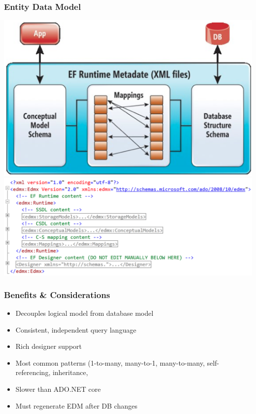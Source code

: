 \documentclass[10pt]{article}
\begin{document}
\subsubsection{Entity Data Model}
\begin{center}
\includegraphics[scale=0.2]{entity_data_model_1.png}
\includegraphics[scale=0.4]{entity_data_model_2.png}
\end{center}
\subsubsection{Benefits \& Considerations}
\begin{itemize}
	\item Decouples logical model from database model
	\item Consistent, independent query language
	\item Rich designer support
	\item Most common patterns (1-to-many, many-to-1, many-to-many, self-referencing, inheritance,
	\item Slower than ADO.NET core
	\item Must regenerate EDM after DB changes
\end{itemize}
\end{document}
